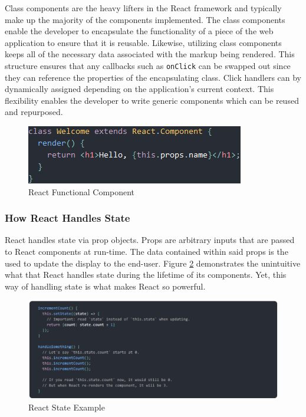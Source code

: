 \documentclass[12pt]{report}
\begin{document}
\begin{enumerate}
Class components are the heavy lifters in the React framework and typically make up the majority of the components implemented. The class components enable the developer to encapsulate the functionality of a piece of the web application to ensure that it is reusable. Likewise, utilizing class components keeps all of the necessary data associated with the markup being rendered. This structure ensures that any callbacks such as \texttt{onClick} can be swapped out since they can reference the properties of the encapsulating class. Click handlers can by dynamically assigned depending on the application's current context. This flexibility enables the developer to write generic components which can be reused and repurposed.

\begin{figure}[h]
	\centering
	\includegraphics[scale=0.5]{react_class_component}
	\caption{React Functional Component}
	\label{fig:reactclasscomponent}
\end{figure}

\subsubsection*{How React Handles State}

React handles state via prop objects. Props are arbitrary inputs that are passed to React components at run-time. The data contained within said props is the used to update the display to the end-user. Figure \ref{fig:reactstateexample} demonstrates the unintuitive what that React handles state during the lifetime of its components. Yet, this way of handling state is what makes React so powerful.

\begin{figure}[h]
	\centering
	\includegraphics[scale=0.5]{react_state_example}
	\caption{React State Example}
	\label{fig:reactstateexample}
\end{figure}


\end{enumerate}
\end{document}
